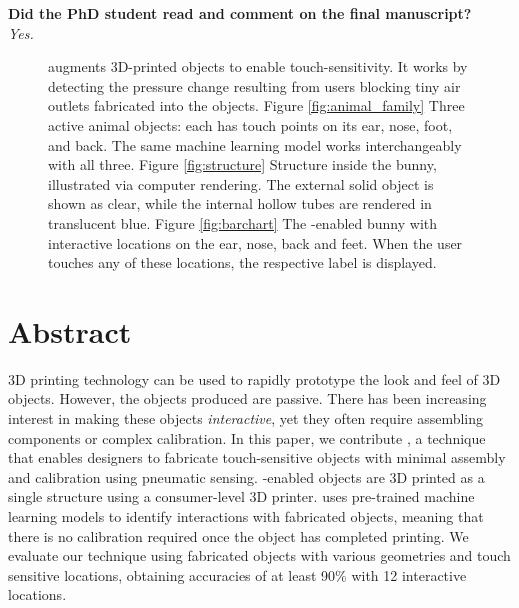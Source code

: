 	\bigskip

	\noindent
	\textbf{Did the PhD student read and comment on the final manuscript?}\\
	\textit{Yes.}

	\bigskip
	\vfill

	\newpage

  \begin{figure}
    \centering

    \caption{\at augments 3D-printed objects to enable touch-sensitivity. It
    works by detecting the pressure change resulting from users blocking tiny
    air outlets fabricated into the objects. Figure \ref{fig:animal_family}
    Three active animal objects: each has touch points on its ear, nose, foot,
    and back. The same machine learning model works interchangeably with all
    three. Figure \ref{fig:structure} Structure inside the bunny, illustrated
    via computer rendering. The external solid object is shown as clear, while
    the internal hollow tubes are rendered in translucent blue.  Figure
    \ref{fig:barchart} The \at-enabled bunny with interactive locations on the
    ear, nose, back and feet. When the user touches any of these locations, the
    respective label is displayed.}

    \label{fig:teaser}%
  \end{figure}

	\section*{Abstract}
		3D printing technology can be used to rapidly prototype the look and feel of
		3D objects. However, the objects produced are passive. There has been
		increasing interest in making these objects \emph{interactive}, yet they
		often require assembling components or complex calibration. In this paper,
		we contribute \emph{\at}, a technique that enables designers to fabricate
		touch-sensitive objects with minimal assembly and calibration using
		pneumatic sensing. \at-enabled objects are 3D printed as a single structure
		using a consumer-level 3D printer. \at uses pre-trained machine learning
		models to identify interactions with fabricated objects, meaning that there
		is no calibration required once the object has completed printing. We
		evaluate our technique using fabricated objects with various geometries and
		touch sensitive locations, obtaining accuracies of at least 90\% with 12
		interactive locations.

